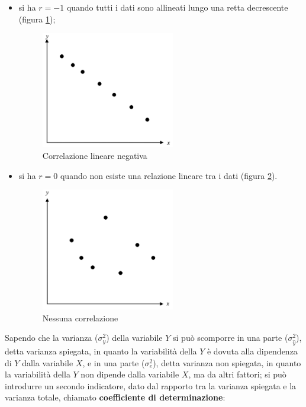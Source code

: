 \begin{itemize}
  \item si ha $r=-1$ quando tutti i dati sono allineati lungo una retta decrescente  (figura \ref{fig:negative_correlation});
      \begin{figure}[H]
\centering
\includegraphics[width=0.55\textwidth,height=\textheight,keepaspectratio]{img/negative_correlation.png}
\caption{Correlazione lineare negativa}
\label{fig:negative_correlation}
\end{figure}
  \item si ha $r=0$ quando non esiste una relazione lineare tra i dati  (figura \ref{fig:no_correlation}).
  \begin{figure}[H]
\centering
\includegraphics[width=0.55\textwidth,height=\textheight,keepaspectratio]{img/no_correlation.png}
\caption{Nessuna correlazione}
\label{fig:no_correlation}
\end{figure}
\end{itemize}

Sapendo che la varianza ($\sigma_{y}^{2}$) della variabile $Y$ si può scomporre in una parte ($\sigma_{\hat{y}}^{2}$), detta varianza spiegata, in quanto la variabilità della $Y$ è dovuta alla dipendenza di $Y$ dalla variabile $X$, e in una parte ($\sigma_{e}^{2}$), detta varianza non spiegata, in quanto la variabilità della $Y$ non dipende dalla variabile $X$, ma da altri fattori; si può introdurre un secondo indicatore, dato dal rapporto tra la varianza spiegata e la varianza totale, chiamato \textbf{coefficiente di determinazione}:


